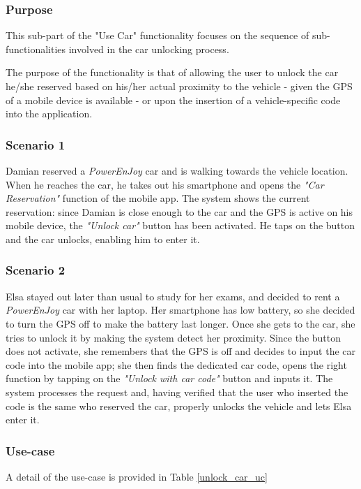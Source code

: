 \subsubsection{Purpose}
This sub-part of the "Use Car" functionality focuses on the sequence of sub-functionalities involved in the car unlocking process.

The purpose of the functionality is that of allowing the user to unlock the car he/she reserved based on his/her actual proximity to the vehicle - given the GPS of a mobile device is available - or upon the insertion of a vehicle-specific code into the application.

\subsubsection{Scenario 1}
Damian reserved a \emph{PowerEnJoy} car and is walking towards the vehicle location. When he reaches the car, he takes out his smartphone and opens the \emph{"Car Reservation"} function of the mobile app. The system shows the current reservation: since Damian is close enough to the car and the GPS is active on his mobile device, the \emph{"Unlock car"} button has been activated. He taps on the button and the car unlocks, enabling him to enter it.

\subsubsection{Scenario 2}
Elsa stayed out later than usual to study for her exams, and decided to rent a \emph{PowerEnJoy} car with her laptop. Her smartphone has low battery, so she decided to turn the GPS off to make the battery last longer. Once she gets to the car, she tries to unlock it by making the system detect her proximity. Since the button does not activate, she remembers that the GPS is off and decides to input the car code into the mobile app; she then finds the dedicated car code, opens the right function by tapping on the \emph{"Unlock with car code"} button and inputs it. The system processes the request and, having verified that the user who inserted the code is the same who reserved the car, properly unlocks the vehicle and lets Elsa enter it.

\subsubsection{Use-case}
A detail of the use-case is provided in Table \ref{unlock_car_uc}

